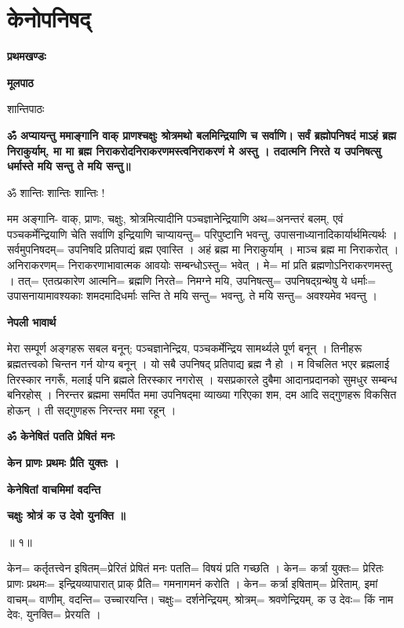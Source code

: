 \documentclass[11pt, a5paper]{article}
\begin{document}
\section{\textbf{केनोपनिषद्}}

\textbf{प्रथमखण्डः}

\textbf{मूलपाठ}

शान्तिपाठः

\textbf{ॐ अप्यायन्तु ममाङ्गानि वाक् प्राणश्चक्षुः श्रोत्रमथो बलमिन्द्रियाणि च सर्वाणि। सर्वं ब्रह्मोपनिषदं माऽहं ब्रह्म निराकुर्याम्, मा मा ब्रह्म निराकरोदनिराकरणमस्त्वनिराकरणं मे अस्तु । तदात्मनि निरते य उपनिषत्सु धर्मास्ते मयि सन्तु ते मयि सन्तु॥}

ॐ शान्तिः शान्तिः शान्तिः !

मम अङ्गानि- वाक्, प्राणः, चक्षुः, श्रोत्रमित्यादीनि पञ्चज्ञानेन्द्रियाणि अथ=अनन्तरं बलम्, एवं पञ्चकर्मेन्द्रियाणि चेति सर्वाणि इन्द्रियाणि चाप्यायन्तु= परिपुष्टानि भवन्तु, उपासनाध्यानादिकार्यार्थमित्यर्थः । सर्वमुपनिषदम्= उपनिषदि प्रतिपाद्यं ब्रह्म एवास्ति । अहं ब्रह्म मा निराकुर्याम् । माञ्च ब्रह्म मा निराकरोत् । अनिराकरणम्= निराकरणाभावात्मक आवयोः सम्बन्धोऽस्तु= भवेत् । मे= मां प्रति ब्रह्मणोऽनिराकरणमस्तु । तत्= एतत्प्रकारेण आत्मनि= ब्रह्मणि निरते= निमग्ने मयि, उपनिषत्सु= उपनिषद्‌ग्रन्थेषु ये धर्माः= उपासनायामावश्यकाः शमदमादिधर्माः सन्ति ते मयि सन्तु= भवन्तु, ते मयि सन्तु= अवश्यमेव भवन्तु ।

\textbf{नेपली भावार्थ}

मेरा सम्पूर्ण अङ्गहरू सबल बनून्;  पञ्चज्ञानेन्द्रिय, पञ्चकर्मेन्द्रिय सामर्थ्यले पूर्ण बनून् । तिनीहरू ब्रह्मतत्त्वको चिन्तन गर्न योग्य बनून् । यो सबै उपनिषद् प्रतिपाद्य ब्रह्म नै हो । म विचलित भएर ब्रह्मलाई तिरस्कार नगरूँ, मलाई पनि ब्रह्मले तिरस्कार नगरोस् । यसप्रकारले दुबैमा आदानप्रदानको सुमधुर सम्बन्ध बनिरहोस् । निरन्तर ब्रह्ममा समर्पित ममा उपनिषद्‌मा व्याख्या गरिएका शम, दम आदि सद्‌गुणहरू विकसित होऊन् । ती सद्‌गुणहरू निरन्तर ममा रहून् ।

\textbf{ॐ केनेषितं पतति प्रेषितं मनः}

\textbf{केन प्राणः प्रथमः प्रैति युक्तः ।}

\textbf{केनेषितां वाचमिमां वदन्ति}

\textbf{चक्षुः श्रोत्रं क उ देवो युनक्ति ॥}

॥ १॥

केन= कर्तृतत्त्वेन इषितम्=प्रेरितं प्रेषितं मनः पतति= विषयं प्रति गच्छति । केन= कर्त्रा युक्तः= प्रेरितः प्राणः प्रथमः= इन्द्रियव्यापारात् प्राक् प्रैति= गमनागमनं करोति । केन= कर्त्रा इषिताम्= प्रेरिताम्, इमां वाचम्= वाणीम्, वदन्ति= उच्चारयन्ति। चक्षुः= दर्शनेन्द्रियम्, श्रोत्रम्= श्रवणेन्द्रियम्, क उ देवः= किं नाम देवः, युनक्ति= प्रेरयति ।
\end{document}
